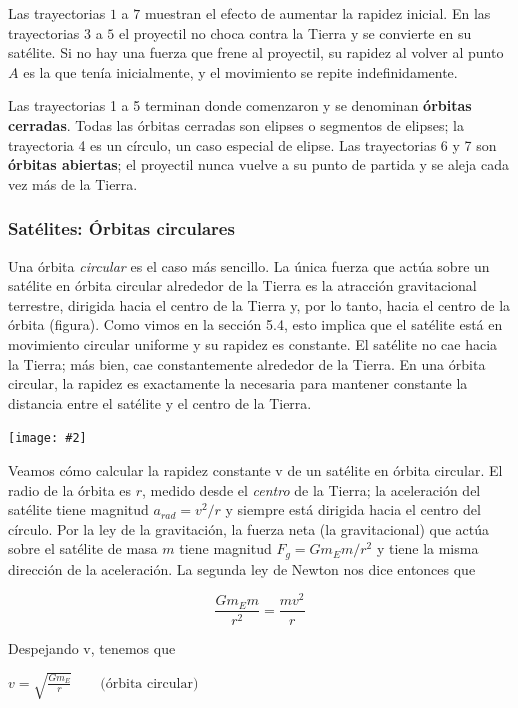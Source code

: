 \documentclass{article}
\newcommand{\newtitle}[1]{
    \color{titleColor}
    \subsubsection{#1}
    \color{black}
}
\newcommand{\bl}[1]{\textbf{#1}}
\newcommand{\definicion}[1]{%
    \vspace{0.5cm}
    \begin{definicionbox}
        #1
    \end{definicionbox}
    \vspace{0.5cm}
}
\newcommand{\ladoALado}[4]{
    \begin{minipage}[t]{#3\textwidth}
        \vspace{0pt}
        #1
    \end{minipage}
    \hfill
    \begin{minipage}[t]{#4\textwidth}
        \vspace{0pt}
        \centering
        \texttt{[image: \#2]}
    \end{minipage}
}
\begin{document}
    \par Las trayectorias $1$ a $7$ muestran el efecto de aumentar la rapidez inicial. En las trayectorias $3$ a $5$ el proyectil no choca contra la Tierra y se convierte en su satélite. Si no hay una fuerza que frene al proyectil, su rapidez al volver al punto $A$ es la que tenía inicialmente, y el movimiento se repite indeﬁnidamente.

    \par Las trayectorias 1 a 5 terminan donde comenzaron y se denominan \bl{órbitas cerradas}. Todas las órbitas cerradas son elipses o segmentos de elipses; la trayectoria 4 es un círculo, un caso especial de elipse. Las trayectorias 6 y 7 son \bl{órbitas abiertas}; el proyectil nunca vuelve a su punto de partida y se aleja cada vez más de la Tierra.

    \newtitle{Satélites: Órbitas circulares}

    \ladoALado{
        \par Una órbita \textit{circular} es el caso más sencillo. La única fuerza que actúa sobre un satélite en órbita circular alrededor de la Tierra es la atracción gravitacional terrestre, dirigida hacia el centro de la Tierra y, por lo tanto, hacia el centro de la órbita (ﬁgura). Como vimos en la sección 5.4, esto implica que el satélite está en movimiento circular uniforme y su rapidez es constante. El satélite no cae hacia la Tierra; más bien, cae constantemente alrededor de la Tierra. En una órbita circular, la rapidez es exactamente la necesaria para mantener constante la distancia entre el satélite y el centro de la Tierra.
    }{img/11.4-2.png}{0.5}{0.5}

    \par Veamos cómo calcular la rapidez constante v de un satélite en órbita circular. El radio de la órbita es $r$, medido desde el \textit{centro} de la Tierra; la aceleración del satélite tiene magnitud $a_{rad} = v^2/r$ y siempre está dirigida hacia el centro del círculo. Por la ley de la gravitación, la fuerza neta (la gravitacional) que actúa sobre el satélite de masa $m$ tiene magnitud $F_g = G m_E m / r^2$ y tiene la misma dirección de la aceleración. La segunda ley de Newton nos dice entonces que

    \[ \frac{G m_E m}{r^2} = \frac{m v^2}{r} \]

    \noindent Despejando v, tenemos que

    \definicion{
        \centering
        \( v = \sqrt{\frac{G m_E}{r}} \quad \quad \text{(órbita circular)} \)
    }
\end{document}
